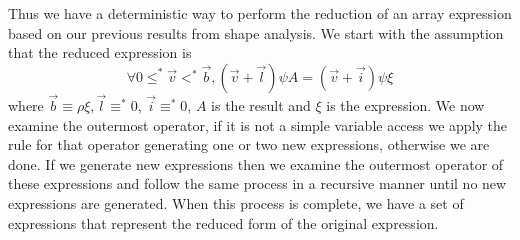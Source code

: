 Thus we have a deterministic way to perform the reduction of an array 
expression based on our previous results from shape analysis.  We start
with the assumption that the reduced expression is 
$$\forall 0\leq^{*}\vec{v}<^{*}\vec{b}, (\vec{v}+\vec{l})\psi A=
(\vec{v}+\vec{i})\psi \xi$$ where $\vec{b}\equiv\rho\xi, \vec{l}\equiv^{*}0$,
$\vec{i}\equiv^{*}0$, $A$ is the result and $\xi$ is the expression.  
We now examine the outermost operator, if it is
not a simple variable access we apply the rule for that operator generating
one or two new expressions, otherwise we are done.  If we generate new
expressions then we examine the outermost operator of these expressions and
follow the same process in a recursive manner until no new expressions are
generated.  When this process is complete, we have a set of expressions 
that represent the reduced form of the original expression.
 

